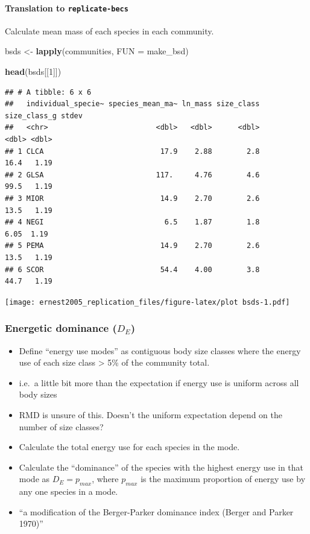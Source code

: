 \documentclass[]{article}
\newenvironment{Shaded}{\begin{snugshade}}{\end{snugshade}}
\newcommand{\KeywordTok}[1]{\textcolor[rgb]{0.13,0.29,0.53}{\textbf{#1}}}
\newcommand{\DataTypeTok}[1]{\textcolor[rgb]{0.13,0.29,0.53}{#1}}
\newcommand{\DecValTok}[1]{\textcolor[rgb]{0.00,0.00,0.81}{#1}}
\newcommand{\StringTok}[1]{\textcolor[rgb]{0.31,0.60,0.02}{#1}}
\newcommand{\NormalTok}[1]{#1}
\providecommand{\tightlist}{%
  \setlength{\itemsep}{0pt}\setlength{\parskip}{0pt}}
\let\oldparagraph\paragraph
\renewcommand{\paragraph}[1]{\oldparagraph{#1}\mbox{}}
\begin{document}
\paragraph{\texorpdfstring{Translation to
\texttt{replicate-becs}}{Translation to replicate-becs}}\label{translation-to-replicate-becs-2}

Calculate mean mass of each species in each community.

\begin{Shaded}
\begin{Highlighting}[]
\NormalTok{bsds <-}\StringTok{ }\KeywordTok{lapply}\NormalTok{(communities, }\DataTypeTok{FUN =}\NormalTok{ make_bsd) }

\KeywordTok{head}\NormalTok{(bsds[[}\DecValTok{1}\NormalTok{]])}
\end{Highlighting}
\end{Shaded}

\begin{verbatim}
## # A tibble: 6 x 6
##   individual_specie~ species_mean_ma~ ln_mass size_class size_class_g stdev
##   <chr>                         <dbl>   <dbl>      <dbl>        <dbl> <dbl>
## 1 CLCA                           17.9    2.88        2.8        16.4   1.19
## 2 GLSA                          117.     4.76        4.6        99.5   1.19
## 3 MIOR                           14.9    2.70        2.6        13.5   1.19
## 4 NEGI                            6.5    1.87        1.8         6.05  1.19
## 5 PEMA                           14.9    2.70        2.6        13.5   1.19
## 6 SCOR                           54.4    4.00        3.8        44.7   1.19
\end{verbatim}

\texttt{[image: ernest2005\_replication\_files/figure-latex/plot bsds-1.pdf]}

\subsubsection{\texorpdfstring{Energetic dominance
(\(D_E\))}{Energetic dominance (D\_E)}}\label{energetic-dominance-d_e}

\begin{itemize}
\tightlist
\item
  Define ``energy use modes'' as contiguous body size classes where the
  energy use of each size class \textgreater{} 5\% of the community
  total.
\item
  i.e.~a little bit more than the expectation if energy use is uniform
  across all body sizes
\item
  RMD is unsure of this. Doesn't the uniform expectation depend on the
  number of size classes?
\item
  Calculate the total energy use for each species in the mode.
\item
  Calculate the ``dominance'' of the species with the highest energy use
  in that mode as \(D_E = p_{max}\), where \(p_{max}\) is the maximum
  proportion of energy use by any one species in a mode.
\item
  ``a modification of the Berger-Parker dominance index (Berger and
  Parker 1970)''
\end{itemize}
\end{document}

